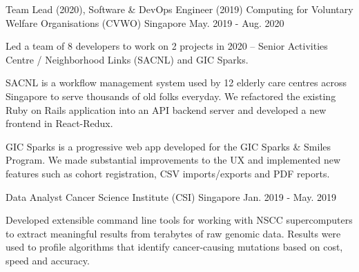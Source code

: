 \begin{cventries}
  \cventry
    {Team Lead (2020), Software \& DevOps Engineer (2019)} %
    {Computing for Voluntary Welfare Organisations (CVWO)} %
    {Singapore} %
    {May. 2019 - Aug. 2020} %
    {
      \begin{cvitems} %
        \item {Led a team of 8 developers to work on 2 projects in 2020 – Senior Activities Centre / Neighborhood Links (SACNL) and GIC Sparks.}
        \item {SACNL is a workflow management system used by 12 elderly care centres across Singapore to serve thousands of old folks everyday. We refactored the existing Ruby on Rails application into an API backend server and developed a new frontend in React-Redux.}
        \item {GIC Sparks is a progressive web app developed for the GIC Sparks \& Smiles Program. We made substantial improvements to the UX and implemented new features such as cohort registration, CSV imports/exports and PDF reports.}
      \end{cvitems}
    }


  \cventry
  {Data Analyst} %
  {Cancer Science Institute (CSI)} %
  {Singapore} %
  {Jan. 2019 - May. 2019} %
  {
    \begin{cvitems} %
      \item {Developed extensible command line tools for working with NSCC supercomputers to extract meaningful results from terabytes of raw genomic data. Results were used to profile algorithms that identify cancer-causing mutations based on cost, speed and accuracy.}
    \end{cvitems}
  }
\end{cventries}
